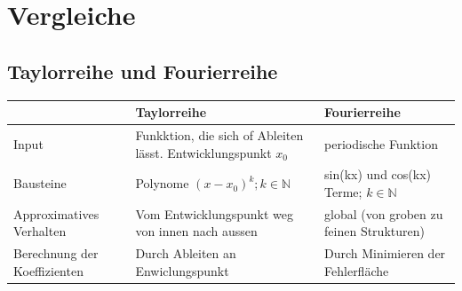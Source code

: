 \section{Vergleiche}
\subsection{Taylorreihe und Fourierreihe}
\begin{tabu} to \linewidth {|X|X|X|}
	\hline
	& Taylorreihe & Fourierreihe \\ 
	\hline
	Input & Funkktion, die sich of Ableiten lässt. Entwicklungspunkt $x_0$ & periodische Funktion \\ \hline
	Bausteine & Polynome $(x - x_0)^k;k\in \mathbb{N}$ & sin(kx) und cos(kx) Terme; $k \in \mathbb{N}$\\ \hline
	Approximatives Verhalten & Vom Entwicklungspunkt weg von innen nach aussen & global (von groben zu feinen Strukturen) \\ \hline
	Berechnung der Koeffizienten & Durch Ableiten an Enwiclungspunkt & Durch Minimieren der Fehlerfläche \\ \hline
\end{tabu}

